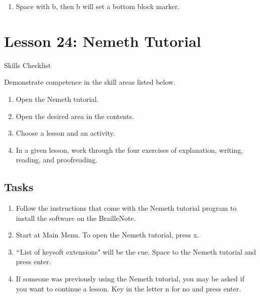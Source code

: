 \documentclass[10pt,letterpaper,twoside]{report}
\begin{document}
{{{{\begin{enumerate}
	\item Space with b, then b will set a bottom block marker.
\end{enumerate}



\section*{Lesson 24: Nemeth Tutorial}


Skills Checklist



Demonstrate competence in the skill areas listed below.



\begin{enumerate}
	\item Open the Nemeth tutorial.
	      
	\item Open the desired area in the contents.
	      
	\item Choose a lesson and an activity.
	      
	\item In a given lesson, work through the four exercises of explanation, writing, reading, and proofreading.
\end{enumerate}



 \subsection{Tasks}



\begin{enumerate}
	\item Follow the instructions that come with the Nemeth tutorial program to install the software on the BrailleNote.
	      
	\item Start at Main Menu.  To open the Nemeth tutorial, press x.
	      
	\item $``$List of keysoft extensions" will be the cue.  Space to the Nemeth tutorial and press enter.
	      
	\item If someone was previously using the Nemeth tutorial, you may be asked if you want to continue a lesson.  Key in the letter n for no and press enter.
	      

\end{enumerate}}}}}
\end{document}
